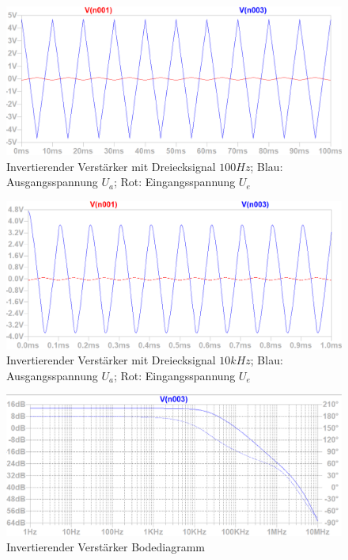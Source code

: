 \documentclass[12pt,a4paper,titlepage]{article}
\begin{document}
\begin{figure}[H]
  \centering
  \includegraphics[width=150mm]{invertierend_dreieck_eingangs_ausgangsspannung}
  \caption{Invertierender Verst\"arker mit Dreiecksignal $100Hz$; Blau: Ausgangsspannung $U_a$; Rot: Eingangsspannung $U_e$}
  \label{figure13}
\end{figure}

\begin{figure}[H]
  \centering
  \includegraphics[width=150mm]{invertierend_dreieck2_eingangs_ausgangsspannung}
  \caption{Invertierender Verst\"arker mit Dreiecksignal $10kHz$; Blau: Ausgangsspannung $U_a$; Rot: Eingangsspannung $U_e$}
  \label{figure14}
\end{figure}

\begin{figure}[H]
  \centering
  \includegraphics[width=150mm]{invertierend_bode1}
  \caption{Invertierender Verst\"arker Bodediagramm}
  \label{figure15}
\end{figure}
\end{document}
